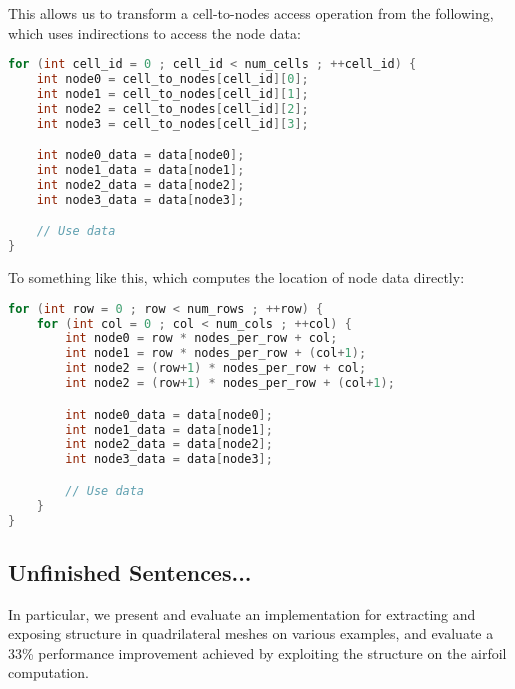 This allows us to transform a cell-to-nodes access operation from the following, which uses indirections to access the node data:
\begin{lstlisting}[language=c++]
for (int cell_id = 0 ; cell_id < num_cells ; ++cell_id) {
	int node0 = cell_to_nodes[cell_id][0];
	int node1 = cell_to_nodes[cell_id][1];
	int node2 = cell_to_nodes[cell_id][2];
	int node3 = cell_to_nodes[cell_id][3];

	int node0_data = data[node0];
	int node1_data = data[node1];
	int node2_data = data[node2];
	int node3_data = data[node3];

	// Use data
}
\end{lstlisting}

To something like this, which computes the location of node data directly:
\begin{lstlisting}[language=c++]
for (int row = 0 ; row < num_rows ; ++row) {
	for (int col = 0 ; col < num_cols ; ++col) {
		int node0 = row * nodes_per_row + col;
		int node1 = row * nodes_per_row + (col+1);
		int node2 = (row+1) * nodes_per_row + col;
		int node2 = (row+1) * nodes_per_row + (col+1);

		int node0_data = data[node0];
		int node1_data = data[node1];
		int node2_data = data[node2];
		int node3_data = data[node3];

		// Use data
	}
}
\end{lstlisting}


\subsection{Unfinished Sentences...}
In particular, we present and evaluate an implementation for extracting and exposing structure in quadrilateral meshes on various examples, and evaluate a 33\% performance improvement achieved by exploiting the structure on the airfoil computation.
